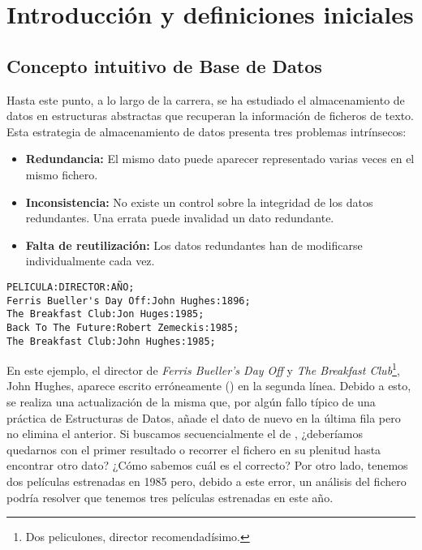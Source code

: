 \chapter{Introducción y definiciones iniciales}

\section{Concepto intuitivo de Base de Datos}

Hasta este punto, a lo largo de la carrera, se ha estudiado el almacenamiento de datos en estructuras abstractas que recuperan la información de ficheros de texto.
Esta estrategia de almacenamiento de datos presenta tres problemas intrínsecos:

\begin{itemize}
	\item\textbf{Redundancia:} El mismo dato puede aparecer representado varias veces en el mismo fichero.
	\item\textbf{Inconsistencia:} No existe un control sobre la integridad de los datos redundantes. Una errata puede invalidad un dato redundante.
	\item\textbf{Falta de reutilización:} Los datos redundantes han de modificarse individualmente cada vez.
\end{itemize}

\begin{lstlisting}
PELICULA:DIRECTOR:AÑO;
Ferris Bueller's Day Off:John Hughes:1896;
The Breakfast Club:Jon Huges:1985;
Back To The Future:Robert Zemeckis:1985;
The Breakfast Club:John Hughes:1985;
\end{lstlisting}

En este ejemplo, el director de \textit{Ferris Bueller's Day Off} y \textit{The Breakfast Club}\footnote{Dos peliculones, director recomendadísimo.}, John Hughes, aparece escrito erróneamente () en la segunda línea.
Debido a esto, se realiza una actualización de la misma que, por algún fallo típico de una práctica de Estructuras de Datos, añade el dato de nuevo en la última fila pero no elimina el anterior.
Si buscamos secuencialmente el  de , ¿deberíamos quedarnos con el primer resultado o recorrer el fichero en su plenitud hasta encontrar otro dato? ¿Cómo sabemos cuál es el correcto?
Por otro lado, tenemos dos películas estrenadas en 1985 pero, debido a este error, un análisis del fichero podría resolver que tenemos tres películas estrenadas en este año.

